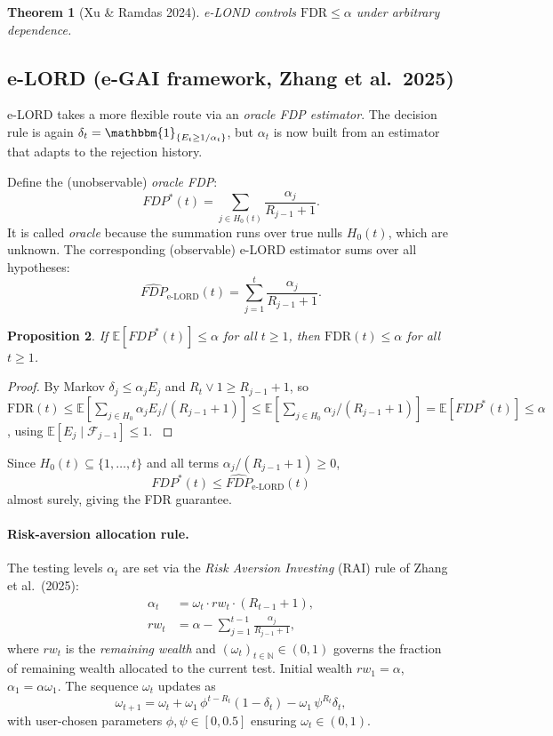 \documentclass[11pt,a4paper,twocolumn]{article}
\theoremstyle{plain}
\newtheorem{theorem}{Theorem}[section]
\newtheorem{proposition}[theorem]{Proposition}
\theoremstyle{definition}
\theoremstyle{remark}
\newcommand{\E}{\mathbb{E}}
\newcommand{\ind}{\mathbbm{1}}
\newcommand{\FDR}{\mathrm{FDR}}
\begin{document}
\begin{theorem}[Xu \& Ramdas 2024]
e-LOND controls $\FDR \le \alpha$ under arbitrary dependence.
\end{theorem}

\subsection{e-LORD (e-GAI framework, Zhang et al.\ 2025)}
\label{sec:elord}

e-LORD takes a more flexible route via an \emph{oracle FDP estimator}. The
decision rule is again $\delta_t = \ind_{\{E_t \geq 1/\alpha_t\}}$, but
$\alpha_t$ is now built from an estimator that adapts to the rejection
history.

Define the (unobservable) \emph{oracle FDP}:
\[
  FDP^*(t) = \sum_{j \in H_0(t)} \frac{\alpha_j}{R_{j-1} + 1}.
\]
It is called \emph{oracle} because the summation runs over true nulls
$H_0(t)$, which are unknown. The corresponding (observable) e-LORD estimator
sums over all hypotheses:
\[
  \widehat{FDP}_{\text{e-LORD}}(t) = \sum_{j=1}^{t} \frac{\alpha_j}{R_{j-1} + 1}.
\]

\begin{proposition}\label{prop:oracle-fdr}
If $\E[FDP^*(t)] \leq \alpha$ for all $t \geq 1$, then $\FDR(t) \leq \alpha$
for all $t \geq 1$.
\end{proposition}

\begin{proof}{\small
By Markov $\delta_j\leq\alpha_j E_j$ and $R_t\vee 1\geq R_{j-1}+1$, so
$\FDR(t)\leq \E[\sum_{j\in H_0}\alpha_j E_j/(R_{j-1}+1)]
\leq \E[\sum_{j\in H_0}\alpha_j/(R_{j-1}+1)] = \E[FDP^*(t)]\leq\alpha$,
using $\E[E_j\mid\mathcal{F}_{j-1}]\leq 1$.
}\end{proof}

Since $H_0(t) \subseteq \{1, \ldots, t\}$ and all terms $\alpha_j/(R_{j-1}+1)
\geq 0$,
\[
  FDP^*(t) \leq \widehat{FDP}_{\text{e-LORD}}(t)
\]
almost surely, giving the FDR guarantee.

\paragraph{Risk-aversion allocation rule.}
The testing levels $\alpha_t$ are set via the \emph{Risk Aversion Investing}
(RAI) rule of Zhang et al.\ (2025):
\begin{align}\label{eq:alphat}
  \alpha_t &= \omega_t \cdot rw_t \cdot (R_{t-1} + 1),\nonumber\\
  rw_t &= \alpha - \sum_{j=1}^{t-1} \frac{\alpha_j}{R_{j-1}+1},
\end{align}
where $rw_t$ is the \emph{remaining wealth} and $(\omega_t)_{t \in
\mathbb{N}} \in (0,1)$ governs the fraction of remaining wealth allocated to
the current test. Initial wealth $rw_1 = \alpha$, $\alpha_1 = \alpha
\omega_1$. The sequence $\omega_t$ updates as
\begin{equation}\label{eq:omegat}
  \omega_{t+1} = \omega_t + \omega_1\,\phi^{t-R_t}(1-\delta_t) - \omega_1\,\psi^{R_t}\delta_t,
\end{equation}
with user-chosen parameters $\phi, \psi \in [0, 0.5]$ ensuring $\omega_t \in
(0,1)$.
\end{document}
